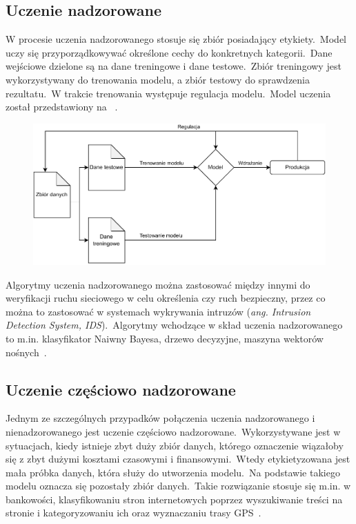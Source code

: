 \subsection{Uczenie nadzorowane}
W procesie uczenia nadzorowanego stosuje się zbiór posiadający etykiety.\ Model uczy się przyporządkowywać określone cechy do konkretnych kategorii.\ Dane wejściowe dzielone są na dane treningowe i dane testowe.\ Zbiór treningowy jest wykorzystywany do trenowania modelu, a zbiór testowy do sprawdzenia rezultatu.\ W trakcie trenowania występuje regulacja modelu.\ Model uczenia został przedstawiony na ~\cite{AiScience, Mahesh2018}.

\begin{figure}[H]
    \centering
    \includegraphics[width=1\textwidth]{images/supervised}
    \label{fig:spervised}
\end{figure}

Algorytmy uczenia nadzorowanego można zastosować między innymi do weryfikacji ruchu sieciowego w celu określenia czy ruch bezpieczny, przez co można to zastosować w systemach wykrywania intruzów (\textit{ang. Intrusion Detection System, IDS}).\ Algorytmy wchodzące w skład uczenia nadzorowanego to m.in. klasyfikator Naiwny Bayesa, drzewo decyzyjne, maszyna wektorów nośnych~\cite{AiScience, Mahesh2018}.

\subsection{Uczenie częściowo nadzorowane}
Jednym ze szczególnych przypadków połączenia uczenia nadzorowanego i nienadzorowanego jest uczenie częściowo nadzorowane.\ Wykorzystywane jest w sytuacjach, kiedy istnieje zbyt duży zbiór danych, którego oznaczenie wiązałoby się z zbyt dużymi kosztami czasowymi i finansowymi.\ Wtedy etykietyzowana jest mała próbka danych, która służy do utworzenia modelu.\ Na podstawie takiego modelu oznacza się pozostały zbiór danych.\ Takie rozwiązanie stosuje się m.in. w bankowości, klasyfikowaniu stron internetowych poprzez wyszukiwanie treści na stronie i kategoryzowaniu ich oraz wyznaczaniu trasy GPS~\cite{semiLinkedin, Mahesh2018}.

